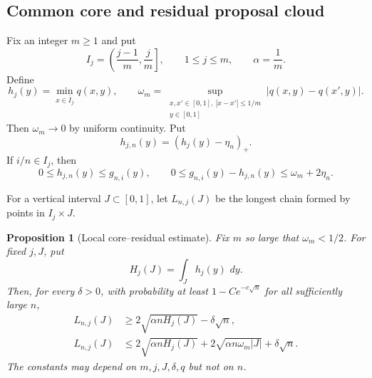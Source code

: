 \documentclass[11pt]{article}
\newtheorem{proposition}[theorem]{Proposition}
\theoremstyle{remark}
\newcommand{\dd}{\,d}
\begin{document}
\subsection{Common core and residual proposal cloud}

Fix an integer $m\ge1$ and put
\[
        I_j=\left(\frac{j-1}{m},\frac jm\right],
        \qquad 1\le j\le m,
        \qquad \alpha=\frac1m.
\]
Define
\begin{equation}\label{eq:h-omega-def}
 h_j(y)=\min_{x\in\overline I_j}q(x,y),
 \qquad
 \omega_m=
 \sup_{\substack{x,x'\in[0,1],\ |x-x'|\le1/m\\y\in[0,1]}}
 |q(x,y)-q(x',y)|.
\end{equation}
Then $\omega_m\to0$ by uniform continuity.  Put
\begin{equation}\label{eq:hjn-def}
        h_{j,n}(y)=(h_j(y)-\eta_n)_+.
\end{equation}
If $i/n\in I_j$, then
\begin{equation}\label{eq:core-residual-density-bounds}
        0\le h_{j,n}(y)\le g_{n,i}(y),
        \qquad
        0\le g_{n,i}(y)-h_{j,n}(y)
        \le \omega_m+2\eta_n.
\end{equation}

For a vertical interval $J\subset[0,1]$, let $L_{n,j}(J)$ be the longest chain
formed by points in $I_j\times J$.

\begin{proposition}[Local core--residual estimate]
\label{prop:local-core-residual}
Fix $m$ so large that $\omega_m<1/2$.  For fixed $j,J$, put
\[
        H_j(J)=\int_Jh_j(y)\,\dd y.
\]
Then, for every $\delta>0$, with probability at least
$1-Ce^{-c\sqrt n}$ for all sufficiently large $n$,
\begin{align}
 L_{n,j}(J)
 &\ge 2\sqrt{\alpha nH_j(J)}-\delta\sqrt n,
 \label{eq:local-lower}\\
 L_{n,j}(J)
 &\le 2\sqrt{\alpha nH_j(J)}
       +2\sqrt{\alpha n\omega_m|J|}
       +\delta\sqrt n.
 \label{eq:local-upper}
\end{align}
The constants may depend on $m,j,J,\delta,q$ but not on $n$.
\end{proposition}
\end{document}
